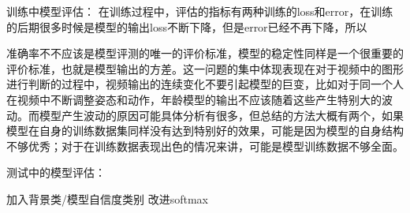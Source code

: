 训练中模型评估：
在训练过程中，评估的指标有两种训练的loss和error，在训练的后期很多时候是模型的输出loss不断下降，但是error已经不再下降，所以

准确率不不应该是模型评测的唯一的评价标准，模型的稳定性同样是一个很重要的评价标准，也就是模型输出的方差。这一问题的集中体现表现在对于视频中的图形进行判断的过程中，视频输出的连续变化不要引起模型的巨变，比如对于同一个人在视频中不断调整姿态和动作，年龄模型的输出不应该随着这些产生特别大的波动。而模型产生波动的原因可能具体分析有很多，但总结的方法大概有两个，如果模型在自身的训练数据集同样没有达到特别好的效果，可能是因为模型的自身结构不够优秀；对于在训练数据表现出色的情况来讲，可能是模型训练数据不够全面。


测试中的模型评估：

加入背景类/模型自信度类别
改进softmax 

